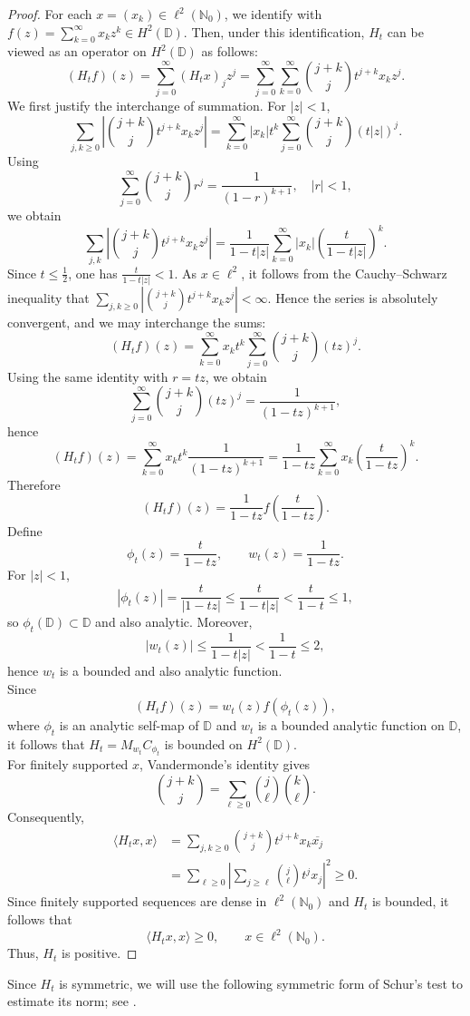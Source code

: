 \documentclass[12pt, reqno]{amsart}
\numberwithin{equation}{section}
\begin{document}
\begin{proof}
  For each  $x=(x_k)\in \ell^2(\mathbb{N}_0)$, we identify with
$f(z)=\sum_{k=0}^{\infty} x_k z^k \in H^2(\mathbb{D}).$
Then, under this identification, $H_t$ can be viewed as an operator on $H^2(\mathbb{D})$ as follows:
\[
({H}_t f)(z)
=\sum_{j=0}^{\infty} ({H}_t x)_j z^j
= \sum_{j=0}^{\infty} \sum_{k=0}^{\infty} \binom{j+k}{j} t^{j+k} x_k z^j.
\]
We first justify the interchange of summation. For $|z|<1$,
\[
\sum_{j,k\ge0} \left|\binom{j+k}{j} t^{j+k} x_k z^j\right|
= \sum_{k=0}^{\infty} |x_k| t^k \sum_{j=0}^{\infty} \binom{j+k}{j} (t|z|)^j.
\]
Using
\[
\sum_{j=0}^{\infty} \binom{j+k}{j} r^j = \frac{1}{(1-r)^{k+1}}, \quad |r|<1,
\]
we obtain
\[
\sum_{j,k} \left|\binom{j+k}{j} t^{j+k} x_k z^j\right|
= \frac{1}{1-t|z|} \sum_{k=0}^{\infty} |x_k|
\left(\frac{t}{1-t|z|}\right)^k.
\]
Since $t\leq \frac{1}{2}$, one has $\frac{t}{1-t|z|}<1$. As $x\in \ell^2$, it follows from the Cauchy--Schwarz inequality that $\sum_{j,k\ge0} \left|\binom{j+k}{j} t^{j+k} x_k z^j\right|< \infty$. Hence the series is absolutely convergent, and we may interchange the sums:
\[
({H}_t f)(z)
= \sum_{k=0}^{\infty} x_k  t^k
\sum_{j=0}^{\infty} \binom{j+k}{j} (tz)^j.
\]
Using the same identity with $r=tz$, we obtain
\[
\sum_{j=0}^{\infty} \binom{j+k}{j} (tz)^j
= \frac{1}{(1-tz)^{k+1}},
\]
hence
\[
({H}_t f)(z)
= \sum_{k=0}^{\infty} x_k t^k \frac{1}{(1-tz)^{k+1}}
= \frac{1}{1-tz} \sum_{k=0}^{\infty} x_k \left(\frac{t}{1-tz}\right)^k.
\]
Therefore
\[
({H}_t f)(z)
= \frac{1}{1-tz} f\!\left(\frac{t}{1-tz}\right).
\]
Define
\[
{\phi}_t(z)=\frac{t}{1-tz}, \qquad
{w}_t(z)=\frac{1}{1-tz}.
\]
For $|z|<1$,
\[
|{\phi}_t(z)|=\frac{t}{|1-tz|}
\le \frac{t}{1-t|z|}<\frac{t}{1-t}\le 1,
\]
so ${\phi}_t(\mathbb{D})\subset \mathbb{D}$ and also analytic. Moreover,
\[
|{w}_t(z)|\le \frac{1}{1-t|z|}<\frac{1}{1-t}\le 2,
\]
hence ${w}_t$ is a bounded and also analytic function.\\
Since
\[
({H}_t f)(z)={w}_t(z) f({\phi}_t(z)),
\]
where ${\phi}_t$ is an analytic self-map of $\mathbb{D}$ and ${w}_t$ is a bounded analytic function on $\mathbb{D}$, it follows that ${H}_t = M_{{w}_t} C_{{\phi}_t}$ is bounded on $H^2(\mathbb{D})$.\\
For finitely supported $x$, Vandermonde's identity gives
\[
\binom{j+k}{j}
=
\sum_{\ell\geq0}
\binom{j}{\ell}\binom{k}{\ell}.
\]
Consequently,
\[
\begin{aligned}
\langle H_tx,x\rangle
&=
\sum_{j,k\geq0}
\binom{j+k}{j}t^{j+k}x_k\overline{x_j}\\
&=
\sum_{\ell\geq0}
\left|
\sum_{j\geq\ell}
\binom{j}{\ell}t^jx_j
\right|^2
\geq0.
\end{aligned}
\]
Since finitely supported sequences are dense in
$\ell^2(\mathbb N_0)$ and $H_t$ is bounded, it follows that
\[
\langle H_tx,x\rangle\geq0,
\qquad x\in\ell^2(\mathbb N_0).
\]
Thus, $H_t$ is positive.
\end{proof}
Since $H_t$ is symmetric, we will use the following symmetric form of
Schur's test to estimate its norm; see \cite[p.~24]{hal}.
\end{document}
